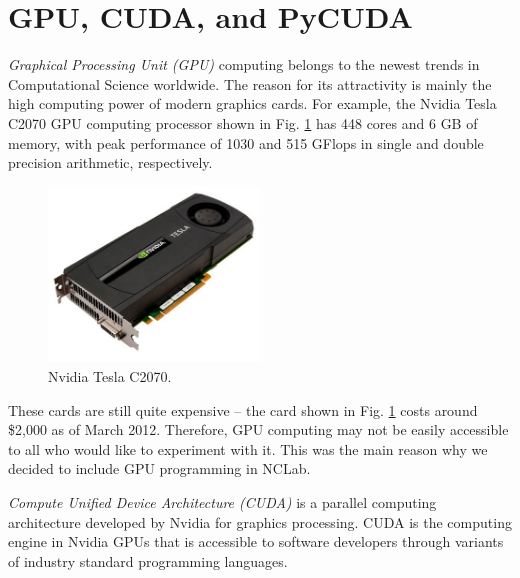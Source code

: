 \documentclass{article}
\begin{document}
\normalsize

\newpage
\setcounter{tocdepth}{2}
\tableofcontents

\newpage

\pagestyle{plain}
\setcounter{page}{1}


\newpage

\pagestyle{plain}

\section{GPU, CUDA, and PyCUDA}

{\em Graphical Processing Unit (GPU)} computing belongs to the newest trends in
Computational Science worldwide. The reason for its attractivity is mainly 
the high computing power of modern graphics cards. For example, the 
Nvidia Tesla C2070 GPU computing processor shown in Fig. \ref{fig:tesla} 
has 448 cores and 6 GB of memory, with peak performance of 1030 and 515 
GFlops in single and double precision arithmetic, respectively.


\begin{figure}[!ht]
\begin{center}
\includegraphics[width=0.5\textwidth]{img/tesla.png}
\caption{Nvidia Tesla C2070.}
\label{fig:tesla}
\end{center}
\end{figure}
\noindent
These cards are still quite expensive -- the card shown in Fig. \ref{fig:tesla} costs 
around \$2,000 as of March 2012. Therefore, GPU computing may not be easily accessible 
to all who would like to experiment with it. This was the main reason why we decided to 
include GPU programming in NCLab. 

{\em Compute Unified Device Architecture (CUDA)} is a parallel computing architecture 
developed by Nvidia for graphics processing. CUDA is the computing engine in 
Nvidia GPUs that is accessible to software developers through variants of 
industry standard programming languages.
\end{document}
